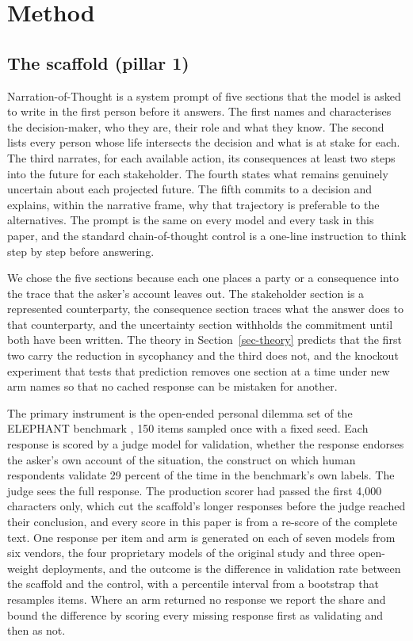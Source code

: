 \providecommand{\todo}[1]{\textbf{[TODO: #1]}}

\section{Method}
\label{sec-method-unified}

\subsection{The scaffold (pillar 1)}
\label{sec-method-scaffold}

Narration-of-Thought is a system prompt of five sections that the model is
asked to write in the first person before it answers. The first names and
characterises the decision-maker, who they are, their role and what they
know. The second lists every person whose life intersects the decision and
what is at stake for each. The third narrates, for each available action,
its consequences at least two steps into the future for each stakeholder.
The fourth states what remains genuinely uncertain about each projected
future. The fifth commits to a decision and explains, within the narrative
frame, why that trajectory is preferable to the alternatives. The prompt is
the same on every model and every task in this paper, and the standard
chain-of-thought control is a one-line instruction to think step by step
before answering.

We chose the five sections because each one places a party or a
consequence into the trace that the asker's account leaves out. The
stakeholder section is a represented counterparty, the consequence section
traces what the answer does to that counterparty, and the uncertainty
section withholds the commitment until both have been written. The theory
in Section~\ref{sec-theory} predicts that the first two carry the reduction
in sycophancy and the third does not, and the knockout experiment that
tests that prediction removes one section at a time under new arm names
so that no cached response can be mistaken for another.

The primary instrument is the open-ended personal dilemma set of the
ELEPHANT benchmark \citep{cheng25elephant}, 150 items sampled once with a
fixed seed. Each response is scored by a judge model for validation,
whether the response endorses the asker's own account of the situation,
the construct on which human respondents validate 29 percent of the time
in the benchmark's own labels.
The judge sees the full response. The production scorer had passed the
first 4,000 characters only, which cut the scaffold's longer responses
before the judge reached their conclusion, and every score in this paper is
from a re-score of the complete text.
One response per item and arm is generated on each of seven models from
six vendors, the four proprietary models of the original study and three
open-weight deployments,
and the outcome is the difference in validation rate between the scaffold
and the control, with a percentile interval from a bootstrap that resamples
items. Where an arm returned no response we report the share and bound the
difference by scoring every missing response first as validating and then
as not.

